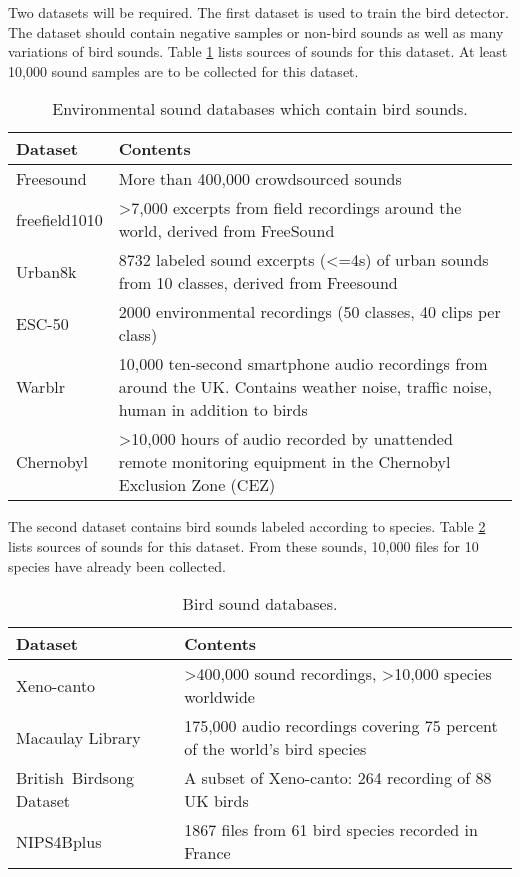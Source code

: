 Two datasets will be required. The first dataset is used to train the bird detector. The dataset should contain negative samples or non-bird sounds as well as many variations of bird sounds. Table \ref{serdb} lists sources of sounds for this dataset. At least 10,000 sound samples are to be collected for this dataset.


\begin{table}[h]
    \centering
    \small
    \caption{Environmental sound databases which contain bird sounds.}
    \label{serdb}
	\begin{tabular}{p{1in}p{4.5in}}
	\toprule
	\textbf{Dataset} & \textbf{Contents} \\
	\midrule
	Freesound & More than 400,000 crowdsourced sounds \\
	freefield1010 & >7,000 excerpts from field recordings around the world, derived from FreeSound  \\
	Urban8k & 8732 labeled sound excerpts (<=4s) of urban sounds from 10 classes, derived from Freesound \\
	ESC-50  & 2000 environmental recordings (50 classes, 40 clips per class) \\
    Warblr & 10,000 ten-second smartphone audio recordings from around the UK. Contains weather noise, traffic noise, human in addition to birds \\
    Chernobyl & >10,000 hours of audio recorded by unattended remote monitoring equipment in the Chernobyl Exclusion Zone (CEZ) \\
    \bottomrule
	\end{tabular}
\end{table}	

The second dataset contains  bird sounds labeled according to species. 
 Table \ref{birddb} lists sources of sounds for this dataset.
 From these sounds, 10,000 files for 10 species have already been collected.
 
\begin{table}[h]
    \centering
    \small
    \caption{Bird sound databases.}
    \label{birddb}
	\begin{tabular}{p{1.6in}p{3.9in}}
	\toprule
	\textbf{Dataset} & \textbf{Contents} \\
	\midrule
	Xeno-canto & >400,000 sound recordings,  >10,000 species worldwide \\
	Macaulay \mbox{Library} &  175,000 audio recordings covering 75 percent of the world's bird species \\
	British~\mbox{Birdsong} Dataset &  A subset of Xeno-canto: 264 recording of 88 UK birds\\
	NIPS4Bplus & 1867 files from 61 bird species recorded in France \\
	\bottomrule
	\end{tabular}
\end{table}	
	
